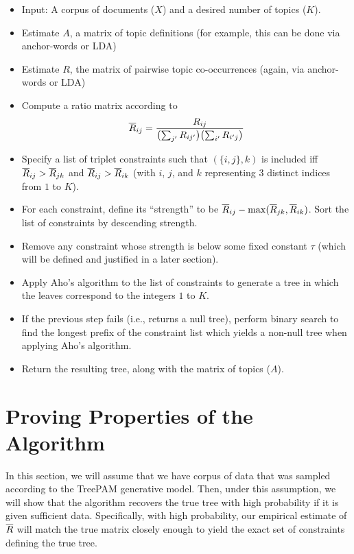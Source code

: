 \documentclass{article}
\theoremstyle{definition}
\begin{document}
\begin{itemize}
  \item Input: A corpus of documents ($X$) and a desired number of topics ($K$).
  \item Estimate $A$, a matrix of topic definitions (for example, this can be done via anchor-words or LDA)
  \item Estimate $R$, the matrix of pairwise topic co-occurrences (again, via anchor-words or LDA)
  \item Compute a ratio matrix according to
  \begin{align}
  \overline{R}_{ij} = \frac{R_{ij}}{ \bigl( \sum_{j'} R_{ij'} \bigr) \bigl( \sum_{i'} R_{i'j} \bigr) }
  \end{align}
  \item Specify a list of triplet constraints such that $(\{i, j\}, k)$ is included iff $\overline{R}_{ij} > \overline{R}_{jk}$ and $\overline{R}_{ij} > \overline{R}_{ik}$ (with $i$, $j$, and $k$ representing 3 distinct indices from $1$ to $K$).
  \item For each constraint, define its ``strength'' to be $\overline{R}_{ij} - \max(\overline{R}_{jk}, \overline{R}_{ik})$.
        Sort the list of constraints by descending strength.
  \item Remove any constraint whose strength is below some fixed constant $\tau$ (which will be defined and justified in a later section).
  \item Apply Aho's algorithm to the list of constraints to generate a tree in which the leaves correspond to the integers $1$ to $K$.
  \item If the previous step fails (i.e., returns a null tree), perform binary search to find the longest prefix of the constraint list which yields a non-null tree when applying Aho's algorithm.
  \item Return the resulting tree, along with the matrix of topics ($A$).
\end{itemize}


\section{Proving Properties of the Algorithm}

In this section, we will assume that we have corpus of data that was sampled according to the TreePAM generative model.
Then, under this assumption, we will show that the algorithm recovers the true tree with high probability if it is given sufficient data.
Specifically, with high probability, our empirical estimate of $\overline{R}$ will match the true matrix closely enough to yield the exact set of constraints defining the true tree.
\end{document}
